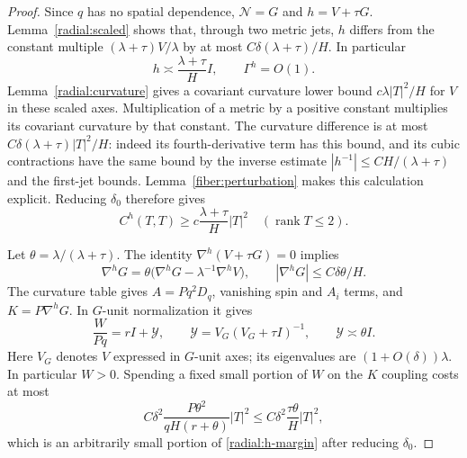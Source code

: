 \begin{proof}
Since $q$ has no spatial dependence, $\mathcal N=G$ and $h=V+\tau G$. Lemma~\ref{radial:scaled} shows that, through two metric jets, $h$ differs from the constant multiple $(\lambda+\tau)V/\lambda$ by at most $C\delta(\lambda+\tau)/H$. In particular
\[
 h\asymp\frac{\lambda+\tau}{H}I,\qquad
 \Gamma^h=O(1).
\]
Lemma~\ref{radial:curvature} gives a covariant curvature lower bound $c\lambda|T|^2/H$ for $V$ in these scaled axes. Multiplication of a metric by a positive constant multiplies its covariant curvature by that constant. The curvature difference is at most $C\delta(\lambda+\tau)|T|^2/H$: indeed its fourth-derivative term has this bound, and its cubic contractions have the same bound by the inverse estimate $|h^{-1}|\le CH/(\lambda+\tau)$ and the first-jet bounds. Lemma~\ref{fiber:perturbation} makes this calculation explicit. Reducing $\delta_0$ therefore gives
\begin{equation}\label{radial:h-margin}
 C^h(T,T)\ge c\frac{\lambda+\tau}{H}|T|^2
 \quad(\operatorname{rank}T\le2).
\end{equation}

Let $\theta=\lambda/(\lambda+\tau)$. The identity $\nabla^h(V+\tau G)=0$ implies
\[
 \nabla^h G=\theta\bigl(\nabla^hG-\lambda^{-1}\nabla^hV\bigr),
 \qquad |\nabla^hG|\le C\delta\theta/H.
\]
The curvature table gives $A=Pq^2D_q$, vanishing spin and $A_i$ terms, and $K=P\nabla^hG$. In $G$-unit normalization it gives
\begin{equation}\label{radial:W-normalized}
 \frac{W}{Pq}=rI+\mathcal Y,
 \qquad \mathcal Y=V_G(V_G+\tau I)^{-1},
 \qquad \mathcal Y\asymp\theta I.
\end{equation}
Here $V_G$ denotes $V$ expressed in $G$-unit axes; its eigenvalues are $(1+O(\delta))\lambda$. In particular $W>0$. Spending a fixed small portion of $W$ on the $K$ coupling costs at most
\[
 C\delta^2\frac{P\theta^2}{qH(r+\theta)}|T|^2
 \le C\delta^2\frac{\tau\theta}{H}|T|^2,
\]
which is an arbitrarily small portion of \eqref{radial:h-margin} after reducing $\delta_0$.


\end{proof}
